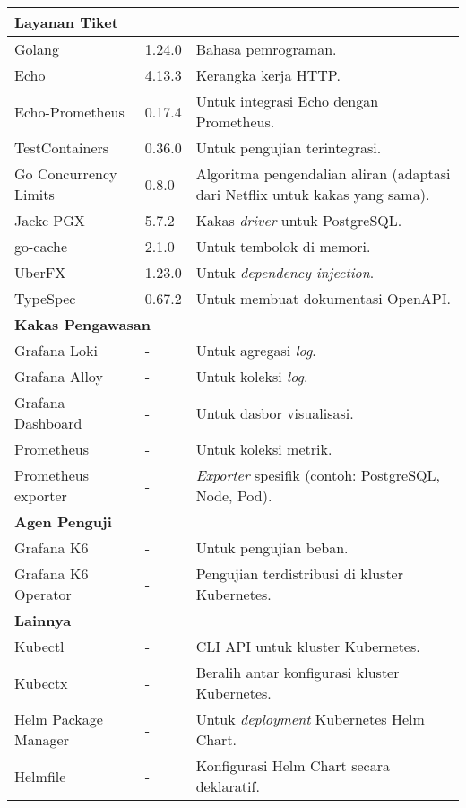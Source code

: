 \begin{longtable}{|l|l|p{}|}
    \multicolumn{3}{|l|}{\textbf{Layanan Tiket}} \\
    \hline
    Golang & 1.24.0 & Bahasa pemrograman. \\
    Echo & 4.13.3 & Kerangka kerja HTTP. \\
    Echo-Prometheus & 0.17.4 & Untuk integrasi Echo dengan Prometheus. \\
    TestContainers & 0.36.0 & Untuk pengujian terintegrasi. \\
    Go Concurrency Limits & 0.8.0 & Algoritma pengendalian aliran (adaptasi dari Netflix untuk kakas yang sama). \\
    Jackc PGX & 5.7.2 & Kakas \textit{driver} untuk PostgreSQL. \\
    go-cache & 2.1.0 & Untuk tembolok di memori. \\
    UberFX & 1.23.0 & Untuk \textit{dependency injection}. \\
    TypeSpec & 0.67.2 & Untuk membuat dokumentasi OpenAPI. \\
    \hline

    \multicolumn{3}{|l|}{\textbf{Kakas Pengawasan}} \\
    \hline
    Grafana Loki & - & Untuk agregasi \textit{log}. \\
    Grafana Alloy & - & Untuk koleksi \textit{log}. \\
    Grafana Dashboard & - & Untuk dasbor visualisasi. \\
    Prometheus & - & Untuk koleksi metrik. \\
    Prometheus exporter & - & \textit{Exporter} spesifik (contoh: PostgreSQL, Node, Pod). \\
    \hline

    \multicolumn{3}{|l|}{\textbf{Agen Penguji}} \\
    \hline
    Grafana K6 & - & Untuk pengujian beban. \\
    Grafana K6 Operator & - & Pengujian terdistribusi di kluster Kubernetes. \\
    \hline

    \multicolumn{3}{|l|}{\textbf{Lainnya}} \\
    \hline
    Kubectl & - & CLI API untuk kluster Kubernetes. \\
    Kubectx & - & Beralih antar konfigurasi kluster Kubernetes. \\
    Helm Package Manager & - & Untuk \textit{deployment} Kubernetes Helm Chart. \\
    Helmfile & - & Konfigurasi Helm Chart secara deklaratif. \\

\end{longtable}
\endgroup
